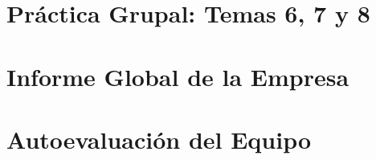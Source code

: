 \documentclass[print, color]{ugrTFG}
\begin{document}
\part{Práctica Grupal: Temas 6, 7 y 8}



\part{Informe Global de la Empresa}



\part{Autoevaluación del Equipo}



\appendix
{}





\backmatter
{}


\end{document}
